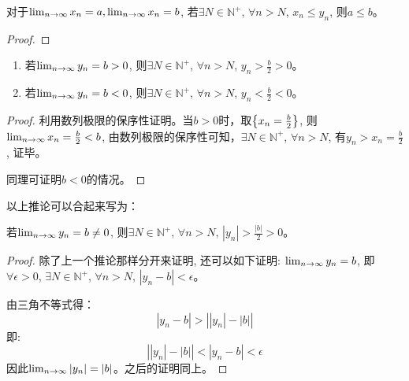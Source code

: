 \documentclass[lang=cn]{elegantbook}
\begin{document}
\begin{lemma}[数列极限的保序性逆命题]\label{lemma:list-order}
    对于$\lim_{n \to \infty } x_n = a,\lim_{n \to \infty } x_n = b$, 若$\exists N \in \mathbb{N}^+$, $\forall n > N$, $x_n \le y_n$, 则$a \le b$。 
\end{lemma}
\begin{proof}
    
\end{proof}

\begin{lemma}
    \begin{enumerate}
        \item 若$\lim_{n \to \infty } y_n = b > 0$, 则$\exists N \in \mathbb{N}^+$, $\forall n > N$, $y_n > \frac{b}{2} > 0 $。
        \item 若$\lim_{n \to \infty } y_n = b < 0$, 则$\exists N \in \mathbb{N}^+$, $\forall n > N$, $y_n < \frac{b}{2} < 0 $。
    \end{enumerate}
\end{lemma}
\begin{proof}
    利用数列极限的保序性证明。当$b > 0$时，取$\left\{ x_n = \frac{b}{2}\right\}$, 则$\lim_{n \to \infty } x_n = \frac{b}{2} < b$, 由数列极限的保序性可知，$\exists N \in \mathbb{N}^+$, $\forall n > N$, 有$y_n > x_n = \frac{b}{2}$, 证毕。

    同理可证明$b < 0$的情况。
\end{proof}
以上推论可以合起来写为：
\begin{lemma}
    若$\lim_{n \to \infty } y_n = b \neq 0$, 则$\exists N \in \mathbb{N}^+$, $\forall n > N$, $\left| y_n \right|> \frac{\left| b \right|}{2} > 0 $。
\end{lemma}
\begin{proof}
    除了上一个推论那样分开来证明, 还可以如下证明:
    $\lim_{n \to \infty } y_n = b$, 即$\forall \epsilon > 0$, $\exists N \in \mathbb{N}^+$, $\forall n > N$, $\left| y_n - b\right| < \epsilon$。

    由三角不等式得：
    \[ \left| y_n - b\right| > \left| \left| y_n \right| - \left| b \right| \right| \]
    即:
    \[ \left| \left| y_n \right| - \left| b \right| \right| < \left| y_n - b\right| < \epsilon \]
    因此$\lim_{n \to \infty } \left| y_n \right| = \left| b \right|$。之后的证明同上。
\end{proof}
\end{document}
